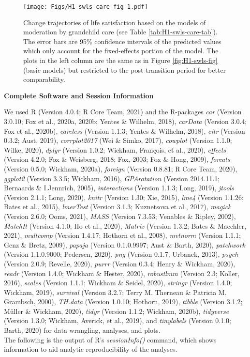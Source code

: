 \documentclass[
  english,
  man, noextraspace]{apa7}
\begin{document}
\begin{appendix}
\begin{figure}
\centering
\texttt{[image: Figs/H1-swls-care-fig-1.pdf]}
\caption{\label{fig:H1-swls-care-fig}Change trajectories of life satisfaction
based on the models of moderation by grandchild care (see Table
\ref{tab:H1-swls-care-tab}). The error bars are 95\% confidence
intervals of the predicted values which only account for the
fixed-effects portion of the model. The plots in the left column are the
same as in Figure \ref{fig:H1-swls-fig} (basic models) but restricted to
the post-transition period for better comparability.}
\end{figure}

\newpage

\noindent  \textbf{Complete Software and Session Information}

We used R (Version 4.0.4; R Core Team, 2021) and the R-packages
\emph{car} (Version 3.0.10; Fox et al., 2020a, 2020b; Yentes \& Wilhelm,
2018), \emph{carData} (Version 3.0.4; Fox et al., 2020b),
\emph{careless} (Version 1.1.3; Yentes \& Wilhelm, 2018), \emph{citr}
(Version 0.3.2; Aust, 2019), \emph{corrplot2017} (Wei \& Simko, 2017),
\emph{cowplot} (Version 1.1.0; Wilke, 2020), \emph{dplyr} (Version
1.0.2; Wickham, François, et al., 2020), \emph{effects} (Version 4.2.0;
Fox \& Weisberg, 2018; Fox, 2003; Fox \& Hong, 2009), \emph{forcats}
(Version 0.5.0; Wickham, 2020a), \emph{foreign} (Version 0.8.81; R Core
Team, 2020), \emph{ggplot2} (Version 3.3.5; Wickham, 2016),
\emph{GPArotation} (Version 2014.11.1; Bernaards \& I.Jennrich, 2005),
\emph{interactions} (Version 1.1.3; Long, 2019), \emph{jtools} (Version
2.1.1; Long, 2020), \emph{knitr} (Version 1.30; Xie, 2015), \emph{lme4}
(Version 1.1.26; Bates et al., 2015), \emph{lmerTest} (Version 3.1.3;
Kuznetsova et al., 2017), \emph{magick} (Version 2.6.0; Ooms, 2021),
\emph{MASS} (Version 7.3.53; Venables \& Ripley, 2002), \emph{MatchIt}
(Version 4.1.0; Ho et al., 2020), \emph{Matrix} (Version 1.3.2; Bates \&
Maechler, 2021), \emph{multcomp} (Version 1.4.17; Hothorn et al., 2008),
\emph{mvtnorm} (Version 1.1.1; Genz \& Bretz, 2009), \emph{papaja}
(Version 0.1.0.9997; Aust \& Barth, 2020), \emph{patchwork} (Version
1.1.0.9000; Pedersen, 2020), \emph{png} (Version 0.1.7; Urbanek, 2013),
\emph{psych} (Version 2.0.9; Revelle, 2020), \emph{purrr} (Version
0.3.4; Henry \& Wickham, 2020), \emph{readr} (Version 1.4.0; Wickham \&
Hester, 2020), \emph{robustlmm} (Version 2.3; Koller, 2016),
\emph{scales} (Version 1.1.1; Wickham \& Seidel, 2020), \emph{stringr}
(Version 1.4.0; Wickham, 2019), \emph{survival} (Version 3.2.7; Terry M.
Therneau \& Patricia M. Grambsch, 2000), \emph{TH.data} (Version 1.0.10;
Hothorn, 2019), \emph{tibble} (Version 3.1.2; Müller \& Wickham, 2020),
\emph{tidyr} (Version 1.1.2; Wickham, 2020b), \emph{tidyverse} (Version
1.3.0; Wickham, Averick, et al., 2019), and \emph{tinylabels} (Version
0.1.0; Barth, 2020) for data wrangling, analyses, and plots.\\
The following is the output of R's \emph{sessionInfo()} command, which
shows information to aid analytic reproducibility of the analyses.


\end{appendix}
\end{document}
